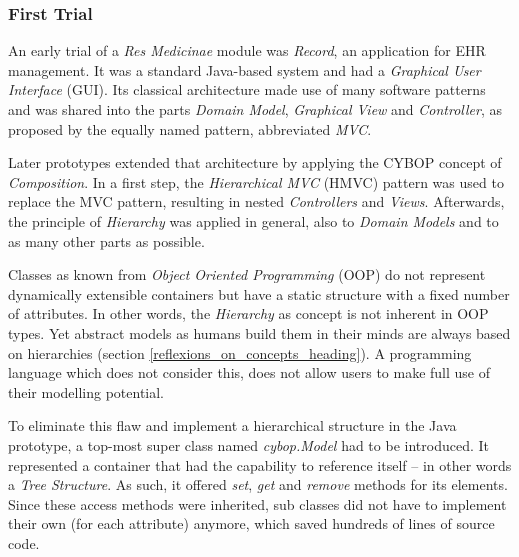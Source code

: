%
%
%
%
%
%
%

\subsubsection{First Trial}
\label{first_trial_heading}

An early trial of a \emph{Res Medicinae} module was \emph{Record}, an
application for EHR management. It was a standard Java-based system and had a
\emph{Graphical User Interface} (GUI). Its classical architecture made use of
many software patterns and was shared into the parts \emph{Domain Model},
\emph{Graphical View} and \emph{Controller}, as proposed by the equally named
pattern, abbreviated \emph{MVC}.

Later prototypes extended that architecture by applying the CYBOP concept of
\emph{Composition}. In a first step, the \emph{Hierarchical MVC} (HMVC) pattern
was used to replace the MVC pattern, resulting in nested \emph{Controllers} and
\emph{Views}. Afterwards, the principle of \emph{Hierarchy} was applied in
general, also to \emph{Domain Models} and to as many other parts as possible.

Classes as known from \emph{Object Oriented Programming} (OOP) do not represent
dynamically extensible containers but have a static structure with a fixed
number of attributes. In other words, the \emph{Hierarchy} as concept is not
inherent in OOP types. Yet abstract models as humans build them in their minds
are always based on hierarchies (section \ref{reflexions_on_concepts_heading}).
A programming language which does not consider this, does not allow users to
make full use of their modelling potential.

To eliminate this flaw and implement a hierarchical structure in the Java
prototype, a top-most super class named \emph{cybop.Model} had to be introduced.
It represented a container that had the capability to reference itself -- in
other words a \emph{Tree Structure}. As such, it offered \emph{set}, \emph{get}
and \emph{remove} methods for its elements. Since these access methods were
inherited, sub classes did not have to implement their own (for each attribute)
anymore, which saved hundreds of lines of source code.

